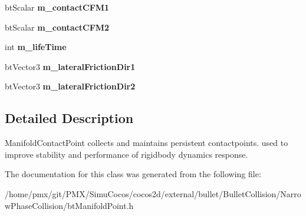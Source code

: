 \begin{DoxyCompactItemize}
\mbox{\label{classbtManifoldPoint_a1f81ad752ad15e975e0a04040a0a1909}} 
bt\+Scalar {\bfseries m\+\_\+contact\+C\+F\+M1}
\item 
\mbox{\label{classbtManifoldPoint_aa4224c3e7075fc9564833e941bd6d6b6}} 
bt\+Scalar {\bfseries m\+\_\+contact\+C\+F\+M2}
\item 
\mbox{\label{classbtManifoldPoint_ac33796d728ab7b10987937a46522ab7f}} 
int {\bfseries m\+\_\+life\+Time}
\item 
\mbox{\label{classbtManifoldPoint_af80f9c429485467e0f7c34952e172020}} 
bt\+Vector3 {\bfseries m\+\_\+lateral\+Friction\+Dir1}
\item 
\mbox{\label{classbtManifoldPoint_a5aedd18945719e40d141aa15011384eb}} 
bt\+Vector3 {\bfseries m\+\_\+lateral\+Friction\+Dir2}
\end{DoxyCompactItemize}


\subsection{Detailed Description}
Manifold\+Contact\+Point collects and maintains persistent contactpoints. used to improve stability and performance of rigidbody dynamics response. 

The documentation for this class was generated from the following file\+:\begin{DoxyCompactItemize}
\item 
/home/pmx/git/\+P\+M\+X/\+Simu\+Cocos/cocos2d/external/bullet/\+Bullet\+Collision/\+Narrow\+Phase\+Collision/bt\+Manifold\+Point.\+h\end{DoxyCompactItemize}
